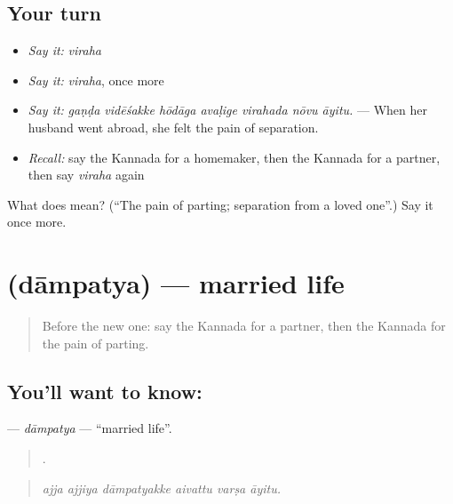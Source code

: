 \subsection*{Your turn}
\begin{itemize}
\raggedright
  \item \emph{Say it:} \emph{viraha}
  \item \emph{Say it:} \emph{viraha}, once more
  \item \emph{Say it:} \emph{gaṇḍa vidēśakke hōdāga avaḷige virahada nōvu āyitu.} — When her husband went abroad, she felt the pain of separation.
  \item \emph{Recall:} say the Kannada for a homemaker, then the Kannada for a partner, then say \emph{viraha} again
\end{itemize}

\begin{tcolorbox}[breakable,colback=teal!4,colframe=teal!35!black,title={Before you move on}]
What does  mean? (\textquotedblleft{}The pain of parting; separation from a loved one\textquotedblright{}.) Say it once more.
\end{tcolorbox}
\section[\texorpdfstring{\kn{ದಾಂಪತ್ಯ} (dāmpatya)}{ದಾಂಪತ್ಯ (dāmpatya)}]{ (dāmpatya) — married life}

\label{lesson:KA-C523-dampatya}



\begin{quote}
Before the new one: say the Kannada for a partner, then the Kannada for the pain of parting.
\end{quote}

\subsection*{You'll want to know: }
\textbf{} — \emph{dāmpatya} — \textquotedblleft{}married life\textquotedblright{}.

\begin{quote}
     .
\end{quote}

\begin{quote}
\emph{ajja ajjiya dāmpatyakke aivattu varṣa āyitu.}
\end{quote}

